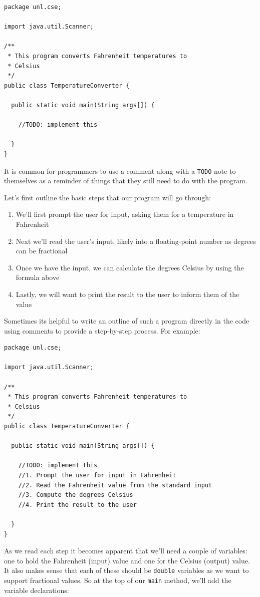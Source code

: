 \begin{verbatim}
package unl.cse;

import java.util.Scanner;

/**
 * This program converts Fahrenheit temperatures to 
 * Celsius
 */
public class TemperatureConverter {

  public static void main(String args[]) {

    //TODO: implement this

  }
}
\end{verbatim}

It is common for programmers to use a comment along with a 
\texttt{TODO} note to themselves as a reminder of things 
that they still need to do with the program.  

Let's first outline the basic steps that our program will go through:
\begin{enumerate}
  \item We'll first prompt the user for input, asking them for a temperature in Fahrenheit
  \item Next we'll read the user's input, likely into a floating-point number as degrees can be fractional
  \item Once we have the input, we can calculate the degrees Celsius by using the formula above
  \item Lastly, we will want to print the result to the user to inform them of the value
\end{enumerate}
Sometimes its helpful to write an outline of such a program directly in the code using
comments to provide a step-by-step process.  For example:

\begin{verbatim}
package unl.cse;

import java.util.Scanner;

/**
 * This program converts Fahrenheit temperatures to 
 * Celsius
 */
public class TemperatureConverter {

  public static void main(String args[]) {

    //TODO: implement this
    //1. Prompt the user for input in Fahrenheit
    //2. Read the Fahrenheit value from the standard input
    //3. Compute the degrees Celsius
    //4. Print the result to the user

  }
}
\end{verbatim}

As we read each step it becomes apparent that we'll need a couple of variables:
one to hold the Fahrenheit (input) value and one for the Celsius (output) value.  It also
makes sense that each of these should be \texttt{double} variables as we
want to support fractional values.  So at the top of our \texttt{main} method, 
we'll add the variable declarations:

